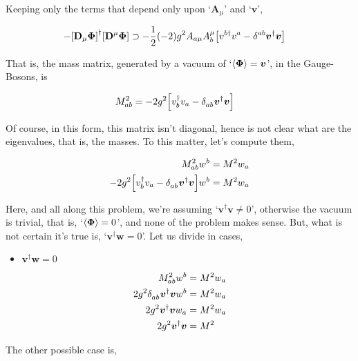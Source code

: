 Keeping only the terms that depend only upon `$\boldsymbol A_\mu$' and `$\boldsymbol v$',

\begin{align}
    -\qty[\vb D_\mu \boldsymbol\Phi]^\dagger\qty[\vb D^\mu\boldsymbol\Phi]&\supset -\frac12 \qty(-2)g^2A_{a\mu}A_b^\mu
    \qty[v^{b\dagger}v^a
    -\tensor{\delta}{^a^b}\boldsymbol v^\dagger\boldsymbol v]\nonumber
\end{align}

That is, the mass matrix, generated by a vacuum of `$\expval{\boldsymbol\Phi}=\boldsymbol v$', in the Gauge-Bosons, is

\begin{align}
    M^2_{ab}&=-2g^2\qty[v_b^{\dagger}v_a
    -\tensor{\delta}{_a_b}\boldsymbol v^\dagger\boldsymbol v]\nonumber
\end{align}

Of course, in this form, this matrix isn't diagonal, hence is not clear what are the eigenvalues, that is, the masses. 
To this matter, let's compute them,

\begin{align}
    M^2_{ab}w^b&=M^2w_a\nonumber\\
    -2g^2\qty[v_b^{\dagger}v_a
    -\tensor{\delta}{_a_b}\boldsymbol v^\dagger\boldsymbol v]w^b&=M^2w_a\nonumber
\end{align}

Here, and all along this problem, we're assuming `$\boldsymbol v^\dagger \boldsymbol v\neq 0$', otherwise the vacuum is 
trivial, that is, `$\expval{\boldsymbol\Phi}=0$', and none of the problem makes sense. But, what is not certain it's true 
is, `$\boldsymbol v^\dagger \boldsymbol w=0$'. Let us divide in cases,

\begin{itemize}
    \item $\boldsymbol v^\dagger \boldsymbol w=0$
\end{itemize}

\begin{align}
    M^2_{ab}w^b&=M^2w_a\nonumber\\
    2g^2\tensor{\delta}{_a_b}\boldsymbol v^\dagger\boldsymbol v w^b&=M^2w_a\nonumber\\
    2g^2\boldsymbol v^\dagger\boldsymbol v w_a&=M^2w_a\nonumber\\
    2g^2\boldsymbol v^\dagger\boldsymbol v&=M^2\nonumber
\end{align}

The other possible case is,

